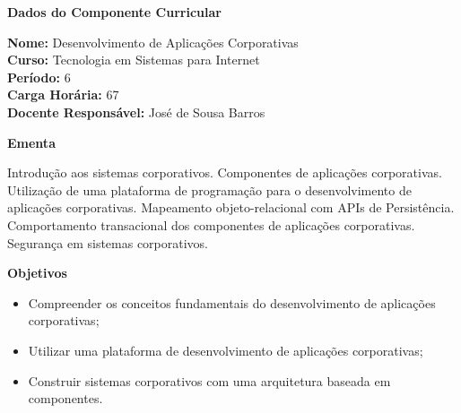 

\begin{snugshade}\begin{center}\textbf{
	Dados do Componente Curricular
}\end{center}\end{snugshade}

\noindent 	\textbf{Nome:} Desenvolvimento de Aplicações Corporativas
\\ 			\textbf{Curso:} Tecnologia em Sistemas para Internet
\\ 			\textbf{Período:} \unit{6}{\degree}
\\ 			\textbf{Carga Horária:} \unit{67}{\hour}
\\ 			\textbf{Docente Responsável:} José de Sousa Barros 


\begin{snugshade}\begin{center}\textbf{
    Ementa
\vphantom{q}}\end{center}\end{snugshade}

\noindent
Introdução aos sistemas corporativos. Componentes de aplicações corporativas.  Utilização de uma plataforma de programação para o desenvolvimento de aplicações corporativas. Mapeamento objeto-relacional com APIs de Persistência. Comportamento transacional dos componentes de aplicações corporativas. Segurança em sistemas corporativos.



\begin{snugshade}\begin{center}\textbf{
    Objetivos
}\end{center}\end{snugshade}


\begin{itemize}

\item Compreender os conceitos fundamentais do desenvolvimento de aplicações corporativas;
\item Utilizar uma plataforma de desenvolvimento de aplicações corporativas;
\item Construir sistemas corporativos com uma arquitetura baseada em componentes.

\end{itemize}




